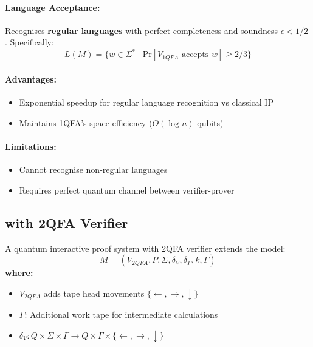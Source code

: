 \paragraph{Language Acceptance:}
Recognises \textbf{regular languages} with perfect completeness and soundness $\epsilon < 1/2$ \cite{yakaryilmaz2013verification}. Specifically:
\[
L(M) = \{w \in \Sigma^* \mid \text{Pr}[V_{1QFA} \text{ accepts } w] \geq 2/3\}
\]

\paragraph{Advantages:}
\begin{itemize}
    \item Exponential speedup for regular language recognition vs classical IP
    \item Maintains 1QFA's space efficiency ($O(\log n)$ qubits)
\end{itemize}

\paragraph{Limitations:}
\begin{itemize}
    \item Cannot recognise non-regular languages
    \item Requires perfect quantum channel between verifier-prover
\end{itemize}

\subsection{ with 2QFA Verifier}
\label{subsec:qip2qfa}

\begin{definition}
A quantum interactive proof system with 2QFA verifier extends the model:
\[
M = (V_{2QFA}, P, \Sigma, \delta_V, \delta_P, k, \Gamma)
\]
\textbf{where:}
\begin{itemize}
    \item $V_{2QFA}$ adds tape head movements $\{\leftarrow, \rightarrow, \downarrow\}$
    \item $\Gamma$: Additional work tape for intermediate calculations
    \item $\delta_V: Q \times \Sigma \times \Gamma \rightarrow Q \times \Gamma \times \{\leftarrow, \rightarrow, \downarrow\}$
\end{itemize}
\end{definition}

